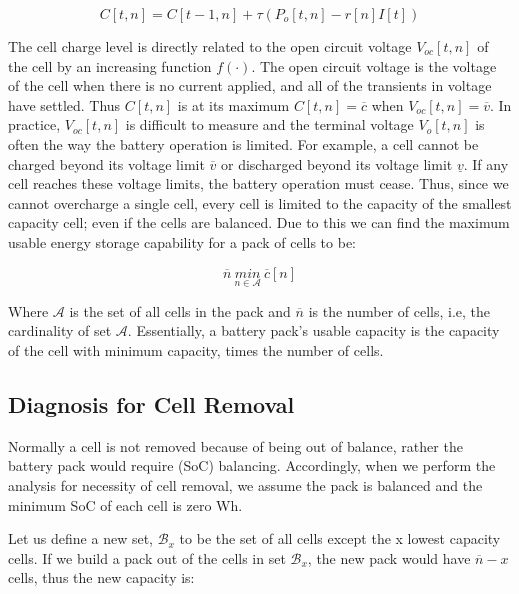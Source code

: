 \documentclass[10pt,twocolumn]{IEEEtran}
\begin{document}
\begin{equation}
C[t,n]=C[t-1,n] +  \tau(P_{o}[t,n] - r[n]I[t])
\label{energycell}
\end{equation}

The cell charge level is directly related to the open circuit voltage $V_{oc}[t,n]$ of the cell by an increasing function $f(\cdot)$.
The open circuit voltage is the voltage of the cell when there is no current applied, and all of the transients in voltage have settled.
Thus $C[t,n]$ is at its maximum $C[t,n]=\overline{c}$  when $V_{oc}[t,n]=\overline{v}$.
In practice, $V_{oc}[t,n]$ is difficult to measure and the terminal voltage $V_o[t,n]$ is often the way the battery operation is limited.
For example, a cell cannot be charged beyond its voltage limit $\overline{v}$ or discharged beyond its voltage limit $\underline{v}$.
If any cell reaches these voltage limits, the battery operation must cease.
Thus, since we cannot overcharge a single cell, every cell is limited to the capacity of the smallest capacity cell; even if the cells are balanced.
Due to this we can find the maximum usable energy storage capability for a pack of cells to be:

\begin{equation}
\overline{n} \ \underset{n\in \mathcal{A}}{min} \ \overline{c}[n]
\label{eq:lhscap}
\end{equation}

Where $\mathcal{A}$ is the set of all cells in the pack and $\overline{n}$ is the number of cells, i.e, the cardinality of set $\mathcal{A}$. 
Essentially, a battery pack's usable capacity is the capacity of the cell with minimum capacity, times the number of cells.




\subsection{Diagnosis for Cell Removal }
Normally  a cell is not removed because of being out of balance,  rather the battery  pack would require (SoC) balancing.
Accordingly,  when we perform the  analysis for necessity of cell removal, we assume the pack is balanced and the minimum SoC of each cell is zero Wh.



Let us define a new set, $\mathcal{B}_x$ to be the set of all cells except the x lowest capacity cells.
If we build a pack out of the cells in set $\mathcal{B}_x$, the new pack would have $\overline{n} - x$ cells, thus the new capacity is:
\end{document}

